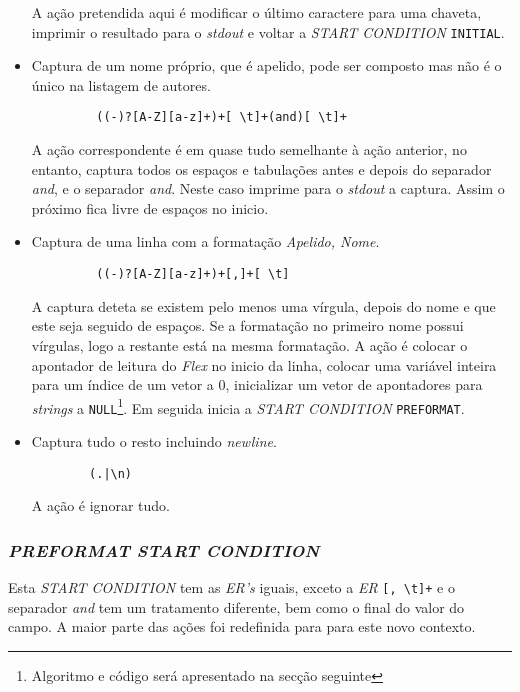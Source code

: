 \begin{itemize}
	A ação pretendida aqui é modificar o último caractere para uma chaveta,
	imprimir o resultado para o \emph{stdout} e voltar a \emph{START CONDITION}
	\texttt{INITIAL}.

	 \item Captura de um nome próprio, que é apelido, pode ser composto
		      mas não é o único na listagem de autores.
    \begin{verbatim}
		 ((-)?[A-Z][a-z]+)+[ \t]+(and)[ \t]+
    \end{verbatim}

		A ação correspondente é em quase tudo semelhante à ação anterior, no
		entanto, captura todos os espaços e tabulações antes e depois do separador
		\emph{and}, e o separador \emph{and}. Neste caso imprime para o \emph{stdout}
		a captura. Assim o próximo fica livre de espaços no inicio.


	\item Captura de uma linha com a formatação \emph{Apelido, Nome}.
    \begin{verbatim}
		 ((-)?[A-Z][a-z]+)+[,]+[ \t]
    \end{verbatim}
A captura deteta se existem pelo menos uma vírgula, depois do nome e que este
seja seguido de espaços. Se a formatação no primeiro nome possui vírgulas, logo
a restante está na mesma formatação. A ação é colocar o apontador de leitura do
\emph{Flex} no inicio da linha, colocar uma variável inteira para um índice de
um vetor a 0, inicializar um vetor de apontadores para \emph{strings} a 
\texttt{NULL}\footnote{Algoritmo e código será apresentado na secção seguinte}.
Em seguida inicia a \emph{START CONDITION} \texttt{PREFORMAT}.


	 \item Captura tudo o resto incluindo \emph{newline}.
    \begin{verbatim}
		(.|\n)
    \end{verbatim}
	A ação é ignorar tudo.


\end{itemize}




\subsubsection{\emph{PREFORMAT \emph{START CONDITION}}}

Esta \emph{START CONDITION} tem as \emph{ER's} iguais, exceto a \emph{ER} \verb|[, \t]+| e 
o separador \emph{and} tem um tratamento diferente, bem como o final do valor do
campo. A maior parte das ações foi redefinida para para este novo contexto.




